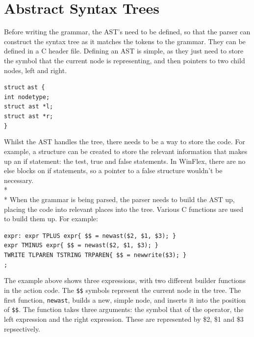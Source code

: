 \documentclass[12pt]{report}
\begin{document}
\section{Abstract Syntax Trees}
Before writing the grammar, the AST's need to be defined, so that the parser can construct the syntax tree as it matches the tokens to the grammar.  They can be defined in a C header file.  Defining an AST is simple, as they just need to store the symbol that the current node is representing, and then pointers to two child nodes, left and right.\\
\begin{tabbing}
	\texttt{struct} \= \texttt{ast \{}\\
	\> \texttt{int nodetype;}\\
	\> \texttt{struct ast *l;}\\
	\> \texttt{struct ast *r;}\\
	\texttt{\}}
\end{tabbing}
Whilst the AST handles the tree, there needs to be a way to store the code.  For example, a structure can be created to store the relevant information that makes up an if statement: the test, true and false statements.  In WinFlex, there are no else blocks on if statements, so a pointer to a false structure wouldn't be necessary.\\*
\\*
When the grammar is being parsed, the parser needs to build the AST up, placing the code into relevant places into the tree.  Various C functions are used to build them up.  For example:
\begin{tabbing}
	\texttt{expr}\=\texttt{: expr TPLUS expr\quad\quad\quad\quad\quad\quad\{ \$\$ = newast(\$2, \$1, \$3); \}}\\
	\> \texttt{\textbar \space expr TMINUS expr\quad\quad\quad\quad\quad\quad\{ \$\$ = newast(\$2, \$1, \$3); \}}\\
	\> \texttt{\textbar \space TWRITE TLPAREN TSTRING TRPAREN\quad\{ \$\$ = newwrite(\$3); \}}\\
	\> \texttt{;}
\end{tabbing}
The example above shows three expressions, with two different builder functions in the action code.  The \texttt{\$\$} symbols represent the current node in the tree.  The first function, \texttt{newast}, builds a new, simple node, and inserts it into the position of \texttt{\$\$}.  The function takes three arguments: the symbol that of the operator, the left expression and the right expression.  These are represented by \$2, \$1 and \$3 repsectively.
\end{document}
